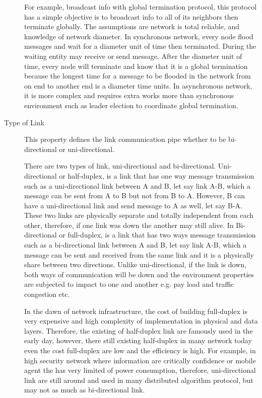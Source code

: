 \begin{description}
For example, broadcast info with global termination protocol, this protocol has a simple objective is to broadcast info to all of its neighbors then terminate globally. The assumptions are network is total reliable, and knowledge of network diameter. In synchronous network, every node flood messages and wait for a diameter unit of time then terminated. During the waiting entity may receive or send message. After the diameter unit of time, every node will terminate and know that it is a global termination because the longest time for a message to be flooded in the network from on end to another end is a diameter time units. In asynchronous network, it is more complex and requires extra works more than synchronous environment such as leader election to coordinate global termination.


\item[Type of Link]
This property defines the link communication pipe whether to be bi-directional or uni-directional.

There are two types of link, uni-directional and bi-directional. Uni-directional or half-duplex, is a link that has one way message transmission such as a uni-directional link between A and B, let say link A-B, which a message can be sent from A to B but not from B to A. However, B can have a uni-directional link and send message to A as well, let say B-A. These two links are physically separate and totally independent from each other, therefore, if one link was down the another may still alive. In Bi-directional or full-duplex, is a link that has two ways message transmission such as a bi-directional link between A and B, let say link A-B, which a message can be sent and received from the same link and it is a physically share between two directions. Unlike uni-directional, if the link is down, both ways of communication will be down and the environment properties are subjected to impact to one and another e.g. pay load and traffic congestion etc.

In the dawn of network infrastructure, the cost of building full-duplex is very expensive and high complexity of implementation in physical and data layers. Therefore, the existing of half-duplex link are famously used in the early day, however, there still existing half-duplex in many network today even the cost full-duplex are low and the efficiency is high. For example, in high security network where information are critically confidence or mobile agent the has very limited of power consumption, therefore, uni-directional link are still around and used in many distributed algorithm protocol, but may not as much as bi-directional link.


\end{description}
